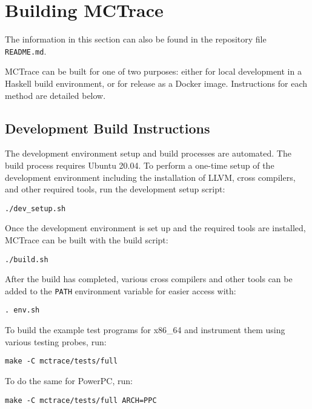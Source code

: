 
\section{Building MCTrace}
\label{sec:building-mctrace}

The information in this section can also be found in the repository file
\texttt{README.md}. 

MCTrace can be built for one of two purposes: either for local
development in a Haskell build environment, or for release as a Docker
image. Instructions for each method are detailed below.

\subsection{Development Build Instructions}
\label{sec:devel-build-instr}

The development environment setup and build processes are automated.
The build process requires Ubuntu 20.04. To perform a one-time setup of
the development environment including the installation of LLVM, cross
compilers, and other required tools, run the development setup script:

\begin{verbatim}
./dev_setup.sh
\end{verbatim}

Once the development environment is set up and the required tools are
installed, MCTrace can be built with the build script:

\begin{verbatim}
./build.sh
\end{verbatim}

After the build has completed, various cross compilers and other tools
can be added to the \texttt{PATH} environment variable for easier access with:

\begin{verbatim}
. env.sh
\end{verbatim}

To build the example test programs for x86\_64 and instrument them
using various testing probes, run:

\begin{verbatim}
make -C mctrace/tests/full
\end{verbatim}

To do the same for PowerPC, run:

\begin{verbatim}
make -C mctrace/tests/full ARCH=PPC
\end{verbatim}

